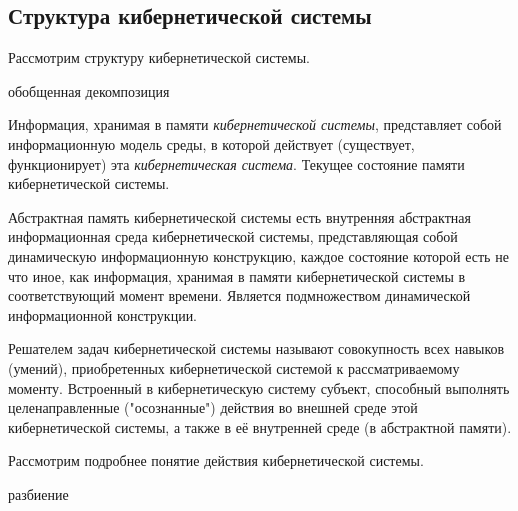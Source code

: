 \subsection{Структура кибернетической системы}
Рассмотрим структуру кибернетической системы.
\begin{SCn}
	\begin{scnrelfromset}{обобщенная декомпозиция}
	\end{scnrelfromset}
\end{SCn}

Информация, хранимая в памяти \textit{кибернетической системы}, представляет собой информационную модель среды, в которой действует (существует, функционирует) эта \textit{кибернетическая система}. Текущее состояние памяти кибернетической системы.

Абстрактная память кибернетической системы есть внутренняя абстрактная информационная среда кибернетической системы, представляющая собой динамическую информационную  конструкцию, каждое состояние которой есть не что иное, как информация, хранимая в памяти кибернетической системы в соответствующий момент времени. Является подмножеством динамической информационной конструкции.

Решателем задач кибернетической системы называют совокупность всех навыков (умений), приобретенных кибернетической системой к рассматриваемому моменту. Встроенный в кибернетическую систему субъект, способный выполнять целенаправленные ("осознанные") действия во внешней среде этой кибернетической системы, а также в её внутренней среде (в абстрактной памяти).


Рассмотрим подробнее понятие действия кибернетической системы.

\begin{SCn}
\begin{scnrelfromset}{разбиение}
	\begin{scnindent}
	\end{scnindent}

\end{scnrelfromset}
\end{SCn}

